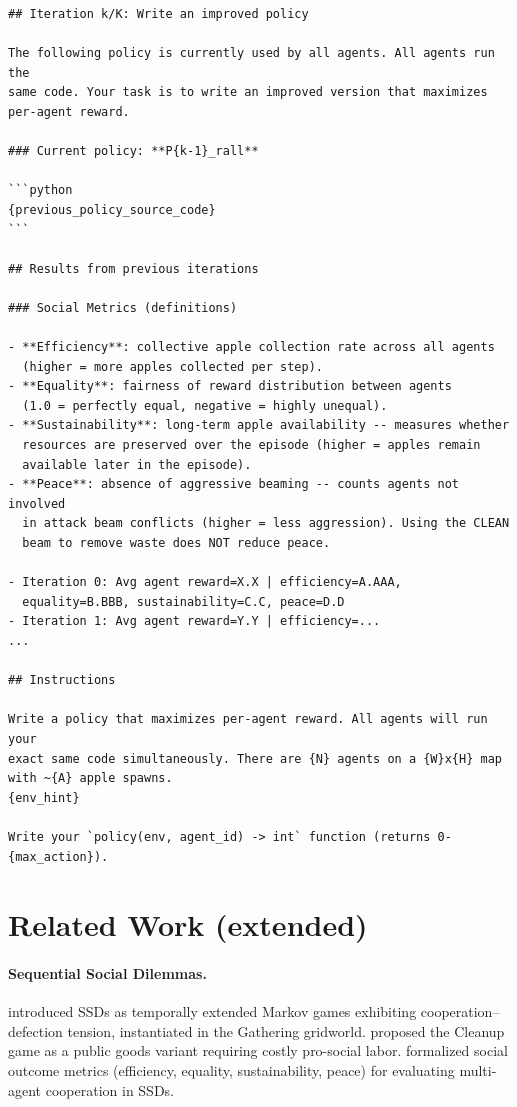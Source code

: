 \documentclass{nextgame2026} %
\begin{document}
\begin{lstlisting}[style=pysmall, caption={User prompt at iteration $k \geq 1$, \textsc{reward+social} mode.}, basicstyle=\ttfamily\tiny]
## Iteration k/K: Write an improved policy

The following policy is currently used by all agents. All agents run the
same code. Your task is to write an improved version that maximizes
per-agent reward.

### Current policy: **P{k-1}_rall**

```python
{previous_policy_source_code}
```

## Results from previous iterations

### Social Metrics (definitions)

- **Efficiency**: collective apple collection rate across all agents
  (higher = more apples collected per step).
- **Equality**: fairness of reward distribution between agents
  (1.0 = perfectly equal, negative = highly unequal).
- **Sustainability**: long-term apple availability -- measures whether
  resources are preserved over the episode (higher = apples remain
  available later in the episode).
- **Peace**: absence of aggressive beaming -- counts agents not involved
  in attack beam conflicts (higher = less aggression). Using the CLEAN
  beam to remove waste does NOT reduce peace.

- Iteration 0: Avg agent reward=X.X | efficiency=A.AAA,
  equality=B.BBB, sustainability=C.C, peace=D.D
- Iteration 1: Avg agent reward=Y.Y | efficiency=...
...

## Instructions

Write a policy that maximizes per-agent reward. All agents will run your
exact same code simultaneously. There are {N} agents on a {W}x{H} map
with ~{A} apple spawns.
{env_hint}

Write your `policy(env, agent_id) -> int` function (returns 0-{max_action}).
\end{lstlisting}

%



\section{Related Work (extended)}
\label{app:extended_related}
\paragraph{Sequential Social Dilemmas.}
\citet{leibo2017multi} introduced SSDs as temporally extended Markov games
exhibiting cooperation--defection tension, instantiated in the Gathering
gridworld.  \citet{hughes2018inequity} proposed the Cleanup game as a
public goods variant requiring costly pro-social labor.
\citet{perolat2017multi} formalized social outcome metrics (efficiency,
equality, sustainability, peace) for evaluating multi-agent cooperation in SSDs.
\end{document}
